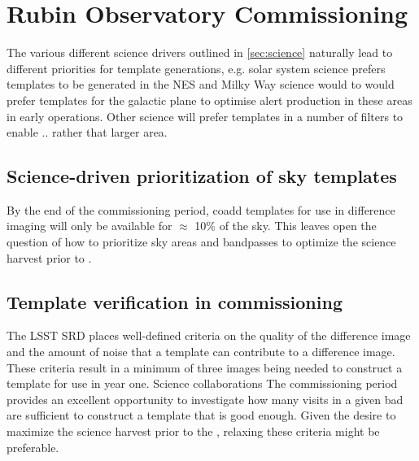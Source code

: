 \section{Rubin Observatory Commissioning} 
\label{sec:commissioning}

The various different science drivers outlined in \ref{sec:science} naturally lead to different priorities for template generations, e.g. solar system science prefers templates to be generated in the NES and Milky Way science would to would prefer templates for the galactic plane to optimise alert production in these areas in early operations. Other science will prefer templates in a number of filters to enable .. rather that larger area. 

\subsection{Science-driven prioritization of sky templates}
By the end of the commissioning period, coadd templates for use in difference imaging will only be available for $\approx$ 10\% of the sky. 
This leaves open the question of how to  prioritize  sky areas and bandpasses to optimize the science harvest prior to \drone.

\subsection{Template verification in commissioning}

The LSST SRD places well-defined criteria on the quality of the difference image and the amount of noise that a template can contribute to a difference image.  These criteria result in a minimum of three images being needed to construct a template for use in year one.  Science collaborations The commissioning period provides an excellent opportunity to investigate how many visits in a given bad are sufficient to construct a template that is good enough.  Given the desire to maximize the science harvest prior to the \drone,  relaxing these criteria might be preferable. 
